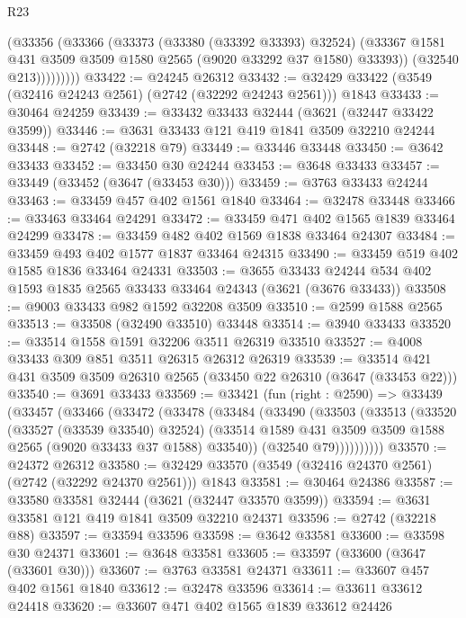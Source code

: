 \begin{lexlean}{R23}
\begin{coremodule}
                (@33356
                  (@33366
                    (@33373
                      (@33380 (@33392 @33393) @32524)
                      (@33367 @1581 @431 @3509 @3509 @1580 @2565 (@9020 @33292 @37 @1580) @33393))
                    (@32540 @213)))))))))
@33422 := @24245 @26312
@33432 := @32429 @33422 (@3549 (@32416 @24243 @2561) (@2742 (@32292 @24243 @2561))) @1843
@33433 := @30464 @24259
@33439 := @33432 @33433 @32444 (@3621 (@32447 @33422 @3599))
@33446 := @3631 @33433 @121 @419 @1841 @3509 @32210 @24244
@33448 := @2742 (@32218 @79)
@33449 := @33446 @33448
@33450 := @3642 @33433
@33452 := @33450 @30 @24244
@33453 := @3648 @33433
@33457 := @33449 (@33452 (@3647 (@33453 @30)))
@33459 := @3763 @33433 @24244
@33463 := @33459 @457 @402 @1561 @1840
@33464 := @32478 @33448
@33466 := @33463 @33464 @24291
@33472 := @33459 @471 @402 @1565 @1839 @33464 @24299
@33478 := @33459 @482 @402 @1569 @1838 @33464 @24307
@33484 := @33459 @493 @402 @1577 @1837 @33464 @24315
@33490 := @33459 @519 @402 @1585 @1836 @33464 @24331
@33503 := @3655
    @33433
    @24244
    @534
    @402
    @1593
    @1835
    @2565
    @33433
    @33464
    @24343
    (@3621 (@3676 @33433))
@33508 := @9003 @33433 @982 @1592 @32208 @3509
@33510 := @2599 @1588 @2565
@33513 := @33508 (@32490 @33510) @33448
@33514 := @3940 @33433
@33520 := @33514 @1558 @1591 @32206 @3511 @26319 @33510
@33527 := @4008 @33433 @309 @851 @3511 @26315 @26312 @26319
@33539 := @33514 @421 @431 @3509 @3509 @26310 @2565 (@33450 @22 @26310 (@3647 (@33453 @22)))
@33540 := @3691 @33433
@33569 := @33421
    (fun (right : @2590) =>
    @33439
      (@33457
        (@33466
          (@33472
            (@33478
              (@33484
                (@33490
                  (@33503
                    (@33513
                      (@33520
                        (@33527 (@33539 @33540) @32524)
                        (@33514 @1589 @431 @3509 @3509 @1588 @2565 (@9020 @33433 @37 @1588) @33540))
                      (@32540 @79))))))))))
@33570 := @24372 @26312
@33580 := @32429 @33570 (@3549 (@32416 @24370 @2561) (@2742 (@32292 @24370 @2561))) @1843
@33581 := @30464 @24386
@33587 := @33580 @33581 @32444 (@3621 (@32447 @33570 @3599))
@33594 := @3631 @33581 @121 @419 @1841 @3509 @32210 @24371
@33596 := @2742 (@32218 @88)
@33597 := @33594 @33596
@33598 := @3642 @33581
@33600 := @33598 @30 @24371
@33601 := @3648 @33581
@33605 := @33597 (@33600 (@3647 (@33601 @30)))
@33607 := @3763 @33581 @24371
@33611 := @33607 @457 @402 @1561 @1840
@33612 := @32478 @33596
@33614 := @33611 @33612 @24418
@33620 := @33607 @471 @402 @1565 @1839 @33612 @24426

\end{coremodule}
\end{lexlean}
